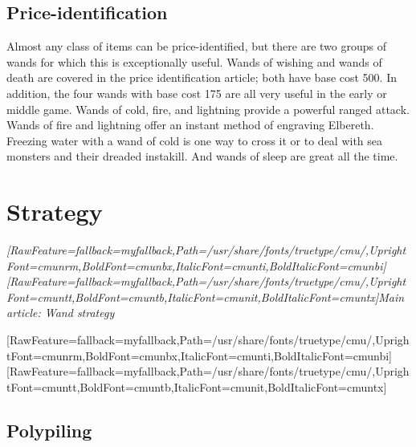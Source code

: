 \subsection{Price-{}identification}
\label{14}
Almost any class of items can be price-{}identified\footnotemark[175], but there are two groups of wands for which this is exceptionally useful. Wands of wishing and wands of death are covered in the price identification\footnotemark[176] article; both have base cost 500. In addition, the four wands with base cost 175 are all very useful in the early or middle game. Wands of cold, fire, and lightning provide a powerful ranged attack. Wands of fire and lightning offer an instant method of engraving Elbereth. Freezing water with a wand of cold is one way to cross it or to deal with sea monsters\footnotemark[177] and their dreaded instakill. And wands of sleep are great all the time.



\section{Strategy}
\label{15}

\begin{myquote}
\item{}{\itshape \allowbreak{}\setmainfont{cmunti.ttf}[RawFeature={fallback=myfallback},Path=/usr/share/fonts/truetype/cmu/,UprightFont=cmunrm,BoldFont=cmunbx,ItalicFont=cmunti,BoldItalicFont=cmunbi]\setmonofont{cmunti.ttf}[RawFeature={fallback=myfallback},Path=/usr/share/fonts/truetype/cmu/,UprightFont=cmuntt,BoldFont=cmuntb,ItalicFont=cmunit,BoldItalicFont=cmuntx]\itshape Main article: Wand strategy\footnotemark[178]}
\end{myquote}
\allowbreak{}\setmainfont{cmunrm.ttf}[RawFeature={fallback=myfallback},Path=/usr/share/fonts/truetype/cmu/,UprightFont=cmunrm,BoldFont=cmunbx,ItalicFont=cmunti,BoldItalicFont=cmunbi]\setmonofont{cmunrm.ttf}[RawFeature={fallback=myfallback},Path=/usr/share/fonts/truetype/cmu/,UprightFont=cmuntt,BoldFont=cmuntb,ItalicFont=cmunit,BoldItalicFont=cmuntx]
\subsection{Polypiling}
\label{16}

